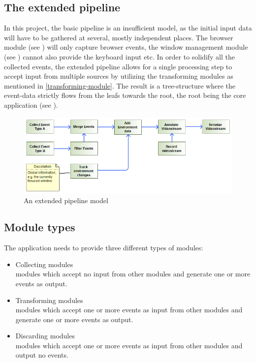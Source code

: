 \subsection{The extended pipeline}
\label{sec:sm_extpipe}
In this project, the basic pipeline is an insufficient model, as the initial input data will have to be gathered at several, mostly independent places. The \gls{browser} module (see ) will only capture \gls{browser} \glspl{event}, the window management \gls{module} (see ) cannot also provide the keyboard input etc. In order to solidify all the collected \glspl{event}, the extended pipeline allows for a single processing step to accept input from multiple sources by utilizing the transforming modules as mentioned in \ref{transforming-module}. The result is a tree-structure where the \gls{event}-data strictly flows from the leafs towards the root, the root being the core application (see ).
\begin{figure}[h!]
  \includegraphics[width=1.00\textwidth]{resources/extendedpipeline.png}
  \centering
  \caption{An extended pipeline model}
  \label{fig:sm_extpipe}
\end{figure}

\subsection{Module types}
\label{sec:module-types}


The application needs to provide three different types of \glspl{module}:
\begin{itemize}
        \item Collecting \glspl{module}\label{collecting-module}\\\Glspl{module} which accept no input from other \glspl{module} and generate one or more \glspl{event} as output.
        \item Transforming \glspl{module}\label{transforming-module}\\\Glspl{module} which accept one or more \glspl{event} as input from other \glspl{module} and generate one or more \glspl{event} as output.
        \item Discarding \glspl{module}\label{discarding-module}\\\Glspl{module} which accept one or more \glspl{event} as input from other \glspl{module} and output no \glspl{event}.
\end{itemize}

